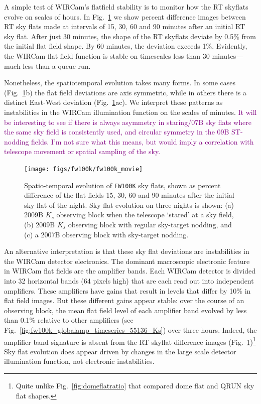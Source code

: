 \documentclass[iop]{emulateapj}
\newcommand{\comment}[1]{\textcolor{purple}{#1}} %
\newcommand{\Fig}[1]{Fig.~\ref{fig:#1}}  %
\begin{document}
A simple test of WIRCam's flatfield stability is to monitor how the RT skyflats evolve on scales of hours.
In \Fig{fw100k_movie} we show percent difference images between RT sky flats made at intervals of 15, 30, 60 and 90 minutes after an initial RT sky flat.
After just 30 minutes, the shape of the RT skyflats deviate by 0.5\% from the initial flat field shape.
By 60 minutes, the deviation exceeds 1\%.
Evidently, the WIRCam flat field function is stable on timescales less than 30 minutes---much less than a queue run.

Nonetheless, the spatiotemporal evolution takes many forms.
In some cases (\Fig{fw100k_movie}b) the flat field deviations are axis symmetric, while in others there is a distinct East-West deviation (\Fig{fw100k_movie}ac).
We interpret these patterns as instabilities in the WIRCam illumination function on the scales of minutes.
\comment{It will be interesting to see if there is always asymmetry in staring/07B sky flats where the same sky field is consistently used, and circular symmetry in the 09B ST-nodding fields. I'm not sure what this means, but would imply a correlation with telescope movement or spatial sampling of the sky.}

\begin{figure}[p]
\centering
\texttt{[image: figs/fw100k/fw100k\_movie]}
\caption{Spatio-temporal evolution of \texttt{FW100K} sky flats, shown as percent difference of the flat fields 15, 30, 60 and 90 minutes after the initial sky flat of the night. Sky flat evolution on three nights is shown: (a) 2009B $K_s$ observing block when the telescope `stared' at a sky field, (b) 2009B $K_s$ observing block with regular sky-target nodding, and (c) a 2007B observing block with sky-target nodding.}
\label{fig:fw100k_movie}
\end{figure}

An alternative interpretation is that these sky flat deviations are instabilities in the WIRCam detector electronics.
The dominant macroscopic electronic feature in WIRCam flat fields are the amplifier bands.
Each WIRCam detector is divided into 32 horizontal bands (64 pixels high) that are each read out into independent amplifiers.
These amplifiers have gains that result in levels that differ by 10\% in flat field images.
But these different gains appear stable: over the course of an observing block, the mean flat field level of each amplifier band evolved by less than 0.1\% relative to other amplifiers (see \Fig{fw100k_globalamp_timeseries_55136_Ks}) over three hours.
Indeed, the amplifier band signature is absent from the RT skyflat difference images (\Fig{fw100k_movie})\footnote{Quite unlike \Fig{domeflatratio} that compared dome flat and QRUN sky flat shapes.}
Sky flat evolution does appear driven by changes in the large scale detector illumination function, not electronic instabilities.
\end{document}
